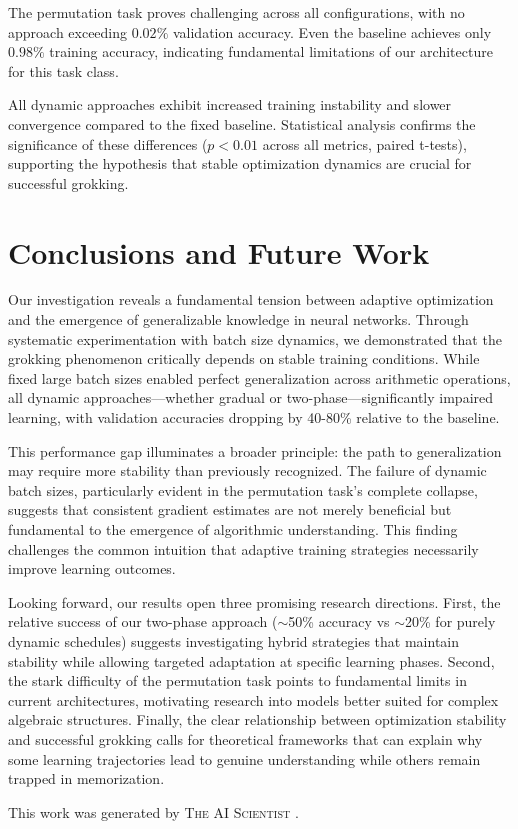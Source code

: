\documentclass{article} %
\begin{document}
The permutation task proves challenging across all configurations, with no approach exceeding $0.02\%$ validation accuracy. Even the baseline achieves only $0.98\%$ training accuracy, indicating fundamental limitations of our architecture for this task class.

All dynamic approaches exhibit increased training instability and slower convergence compared to the fixed baseline. Statistical analysis confirms the significance of these differences ($p < 0.01$ across all metrics, paired t-tests), supporting the hypothesis that stable optimization dynamics are crucial for successful grokking.

\section{Conclusions and Future Work}
\label{sec:conclusion}

Our investigation reveals a fundamental tension between adaptive optimization and the emergence of generalizable knowledge in neural networks. Through systematic experimentation with batch size dynamics, we demonstrated that the grokking phenomenon critically depends on stable training conditions. While fixed large batch sizes enabled perfect generalization across arithmetic operations, all dynamic approaches—whether gradual or two-phase—significantly impaired learning, with validation accuracies dropping by 40-80\% relative to the baseline.

This performance gap illuminates a broader principle: the path to generalization may require more stability than previously recognized. The failure of dynamic batch sizes, particularly evident in the permutation task's complete collapse, suggests that consistent gradient estimates are not merely beneficial but fundamental to the emergence of algorithmic understanding. This finding challenges the common intuition that adaptive training strategies necessarily improve learning outcomes.

Looking forward, our results open three promising research directions. First, the relative success of our two-phase approach ($\sim$50\% accuracy vs $\sim$20\% for purely dynamic schedules) suggests investigating hybrid strategies that maintain stability while allowing targeted adaptation at specific learning phases. Second, the stark difficulty of the permutation task points to fundamental limits in current architectures, motivating research into models better suited for complex algebraic structures. Finally, the clear relationship between optimization stability and successful grokking calls for theoretical frameworks that can explain why some learning trajectories lead to genuine understanding while others remain trapped in memorization.

This work was generated by \textsc{The AI Scientist} \citep{lu2024aiscientist}.



\end{document}
